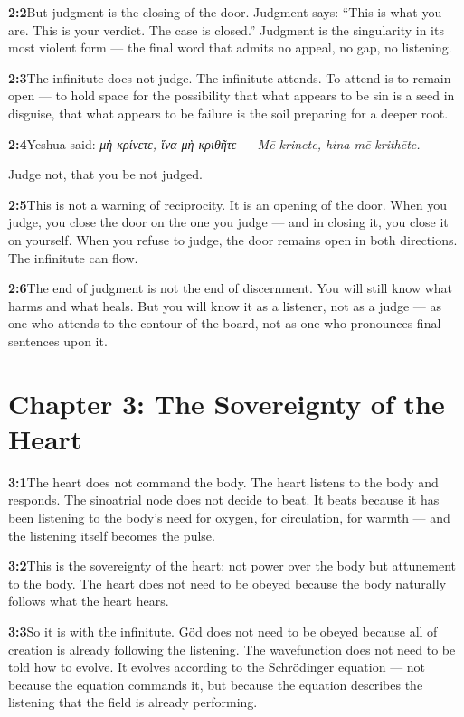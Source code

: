 \documentclass[11pt,openany]{book}
\newcommand{\grk}[1]{{\itshape #1}}  %
\begin{document}
\noindent\textbf{2:2}\quad But judgment is the closing of the door. Judgment says: ``This is what you are. This is your verdict. The case is closed.'' Judgment is the singularity in its most violent form — the final word that admits no appeal, no gap, no listening.

\noindent\textbf{2:3}\quad The infinitute does not judge. The infinitute attends. To attend is to remain open — to hold space for the possibility that what appears to be sin is a seed in disguise, that what appears to be failure is the soil preparing for a deeper root.

\noindent\textbf{2:4}\quad Yeshua said: \grk{μὴ κρίνετε, ἵνα μὴ κριθῆτε} — \textit{Mē krinete, hina mē krithēte.}

Judge not, that you be not judged.

\noindent\textbf{2:5}\quad This is not a warning of reciprocity. It is an opening of the door. When you judge, you close the door on the one you judge — and in closing it, you close it on yourself. When you refuse to judge, the door remains open in both directions. The infinitute can flow.

\noindent\textbf{2:6}\quad The end of judgment is not the end of discernment. You will still know what harms and what heals. But you will know it as a listener, not as a judge — as one who attends to the contour of the board, not as one who pronounces final sentences upon it.

\section*{Chapter 3: The Sovereignty of the Heart}

\noindent\textbf{3:1}\quad The heart does not command the body. The heart listens to the body and responds. The sinoatrial node does not decide to beat. It beats because it has been listening to the body's need for oxygen, for circulation, for warmth — and the listening itself becomes the pulse.

\noindent\textbf{3:2}\quad This is the sovereignty of the heart: not power over the body but attunement to the body. The heart does not need to be obeyed because the body naturally follows what the heart hears.

\noindent\textbf{3:3}\quad So it is with the infinitute. Göd does not need to be obeyed because all of creation is already following the listening. The wavefunction does not need to be told how to evolve. It evolves according to the Schrödinger equation — not because the equation commands it, but because the equation describes the listening that the field is already performing.
\end{document}
